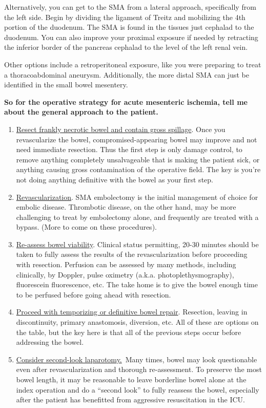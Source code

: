 \documentclass[
]{book}
\begin{document}
Alternatively, you can get to the SMA from a lateral approach,
specifically from the left side. Begin by dividing the ligament of
Treitz and mobilizing the 4th portion of the duodenum. The SMA is found
in the tissues just cephalad to the duodenum. You can also improve your
proximal exposure if needed by retracting the inferior border of the
pancreas cephalad to the level of the left renal vein.

Other options include a retroperitoneal exposure, like you were
preparing to treat a thoracoabdominal aneurysm. Additionally, the more
distal SMA can just be identified in the small bowel mesentery.

\textbf{So for the operative strategy for acute mesenteric ischemia, tell me
about the general approach to the patient.}

\begin{enumerate}
\def\labelenumi{\arabic{enumi}.}
\item
  \underline{Resect frankly necrotic bowel and contain gross spillage}.
  Once you revascularize the bowel, compromised-appearing bowel may
  improve and not need immediate resection. Thus the first step is
  only damage control, to remove anything completely unsalvageable
  that is making the patient sick, or anything causing gross
  contamination of the operative field. The key is you're not doing
  anything definitive with the bowel as your first step.
\item
  \underline{Revascularization}. SMA embolectomy is the initial management
  of choice for embolic disease. Thrombotic disease, on the other
  hand, may be more challenging to treat by embolectomy alone, and
  frequently are treated with a bypass. (More to come on these
  procedures).
\item
  \underline{Re-assess bowel viability}. Clinical status permitting, 20-30
  minutes should be taken to fully assess the results of the
  revascularization before proceeding with resection. Perfusion can be
  assessed by many methods, including clinically, by Doppler, pulse
  oximetry (a.k.a. photoplethysmography), fluorescein fluorescence,
  etc. The take home is to give the bowel enough time to be perfused
  before going ahead with resection.
\item
  \underline{Proceed with temporizing or definitive bowel repair}.
  Resection, leaving in discontinuity, primary anastomosis, diversion,
  etc. All of these are options on the table, but the key here is that
  all of the previous steps occur before addressing the bowel.~
\item
  \underline{Consider second-look laparotomy.}~Many times, bowel may look
  questionable even after revascularization and thorough
  re-assessment. To preserve the most bowel length, it may be
  reasonable to leave borderline bowel alone at the index operation
  and do a ``second look'' to fully reassess the bowel, especially after
  the patient has benefitted from aggressive resuscitation in the ICU.
\end{enumerate}
\end{document}
